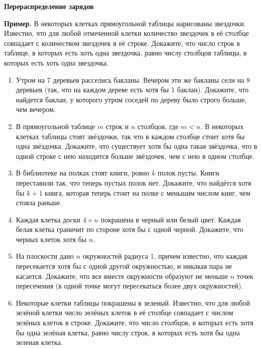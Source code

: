 \documentclass{article}
\begin{document}
\large
	
	
\begin{center}
	\textbf{Перераспределение зарядов}
\end{center}

\textbf{Пример.} В некоторых клетках прямоугольной таблицы нарисованы звездочки. Известно, что для любой отмеченной клетки количество звездочек в её столбце совпадает с количеством звездочек в её строке. Докажите, что число строк в таблице, в которых есть хоть одна звездочка, равно числу столбцов таблицы, в которых есть хоть одна звездочка.

\begin{enumerate}[label*=\protect\fbox{\arabic{enumi}}]
\item Утром на 7 деревьев расселись бакланы. Вечером эти же бакланы сели на 8 деревьев (так, что на каждом дереве есть хотя бы 1 баклан). Докажите, что найдется баклан, у которого утром соседей по дереву было строго больше, чем вечером.
\item В прямоугольной таблице $ m $ строк и $ n $ столбцов, где $ m < n $. В некоторых клетках таблицы стоят звёздочки, так что в каждом столбце стоит хотя бы одна звёздочка. Докажите, что существует хотя бы одна такая звёздочка, что в одной строке с нею находится больше звёздочек, чем с нею в одном столбце.
\item В библиотеке на полках стоят книги, ровно $ k $ полок пусты. Книги переставили так, что теперь пустых полок нет. Докажите, что найдётся хотя бы $ k + 1 $ книга, которая теперь стоит на полке с меньшим числом книг, чем стояла раньше.
\item Каждая клетка доски $ 4 \times n $ покрашена в черный или белый цвет. Каждая белая клетка граничит по стороне хотя бы с одной черной. Докажите, что черных клеток хотя бы $ n $.
\item На плоскости дано $ n $ окружностей радиуса 1, причем известно, что каждая пересекается хотя бы с одной другой окружностью, и никакая пара не касается. Докажите, что все вместе окружности образуют не меньше $ n $ точек пересечения (в одной точке могут пересекаться более двух окружностей).
\item Некоторые клетки таблицы покрашены в зеленый. Известно, что для любой зелёной клетки число зелёных клеток в её столбце совпадает с числом зелёных клеток в строке. Докажите, что число столбцов, в которых есть хотя бы одна зелёная клетка, равно числу строк, в которых есть хотя бы одна зеленая клетка.


\end{enumerate}
\end{document}
